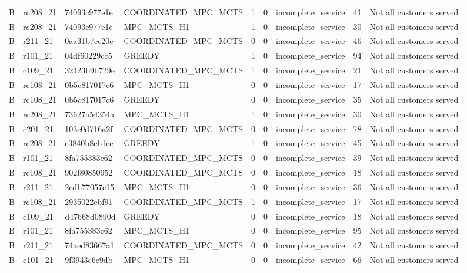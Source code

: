 \begin{table}
{\begin{tabular}{llllrrlrl}
B & rc208\_21 & 74093c977e1e & COORDINATED\_MPC\_MCTS & 1 & 0 & incomplete\_service & 41 & Not all customers served \\
B & rc208\_21 & 74093c977e1e & MPC\_MCTS\_H1 & 1 & 0 & incomplete\_service & 30 & Not all customers served \\
B & r211\_21 & 0aa31b7ce20e & COORDINATED\_MPC\_MCTS & 0 & 0 & incomplete\_service & 46 & Not all customers served \\
B & r101\_21 & 04df60229cc5 & GREEDY & 1 & 0 & incomplete\_service & 94 & Not all customers served \\
B & c109\_21 & 32423b9b729e & COORDINATED\_MPC\_MCTS & 1 & 0 & incomplete\_service & 21 & Not all customers served \\
B & rc108\_21 & 0b5c817017c6 & MPC\_MCTS\_H1 & 0 & 0 & incomplete\_service & 17 & Not all customers served \\
B & rc108\_21 & 0b5c817017c6 & GREEDY & 0 & 0 & incomplete\_service & 35 & Not all customers served \\
B & rc208\_21 & 73627a54354a & MPC\_MCTS\_H1 & 1 & 0 & incomplete\_service & 30 & Not all customers served \\
B & c201\_21 & 103c0d716a2f & COORDINATED\_MPC\_MCTS & 0 & 0 & incomplete\_service & 78 & Not all customers served \\
B & rc208\_21 & c3840b8eb1ce & GREEDY & 1 & 0 & incomplete\_service & 45 & Not all customers served \\
B & r101\_21 & 8fa755383c62 & COORDINATED\_MPC\_MCTS & 0 & 0 & incomplete\_service & 39 & Not all customers served \\
B & rc108\_21 & 902f80850952 & COORDINATED\_MPC\_MCTS & 0 & 0 & incomplete\_service & 18 & Not all customers served \\
B & r211\_21 & 2cdb77057c15 & MPC\_MCTS\_H1 & 0 & 0 & incomplete\_service & 36 & Not all customers served \\
B & rc108\_21 & 2935022cbf91 & COORDINATED\_MPC\_MCTS & 1 & 0 & incomplete\_service & 17 & Not all customers served \\
B & c109\_21 & d47668d0890d & GREEDY & 0 & 0 & incomplete\_service & 18 & Not all customers served \\
B & r101\_21 & 8fa755383c62 & MPC\_MCTS\_H1 & 0 & 0 & incomplete\_service & 95 & Not all customers served \\
B & r211\_21 & 74aed83667a1 & COORDINATED\_MPC\_MCTS & 0 & 0 & incomplete\_service & 42 & Not all customers served \\
B & c101\_21 & 9f3943c6e9db & MPC\_MCTS\_H1 & 0 & 0 & incomplete\_service & 66 & Not all customers served \\

\end{tabular}}
\end{table}
